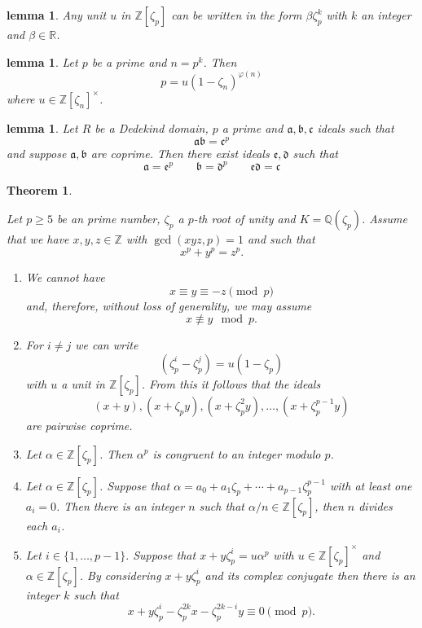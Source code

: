 \documentclass[11pt,a4paper]{amsart}
\theoremstyle{plain}
\newtheorem{theorem}[subsection]{Theorem}
\newtheorem{lemma}[subsection]{lemma}
\theoremstyle{definition}
\theoremstyle{definition}
\newcommand{\ZZ}{\mathbb{Z}}
\newcommand{\RR}{\mathbb{R}}
\def\QQ{\mathbb{Q}}
\def\gothb{\mathfrak{b}}
\def\gothc{\mathfrak{c}}
\def \a{\alpha}
\def\gotha{\mathfrak{a}}
\begin{document}
	
	\begin{lemma}\label{lemma: unit lemma}
		Any unit $u$ in $\ZZ[\zeta_p]$ can be written in the form $\beta \zeta_p^k  $ with $k$ an integer and $\beta \in \RR$.
	\end{lemma}	
	
	\begin{lemma}\label{lemma: fac of p in p_th root}
		Let $p$ be a prime and $n=p^k$. Then \[p=u(1-\zeta_n)^{\varphi(n)}\] where $u \in \ZZ[\zeta_n]^{\times}$.
	\end{lemma}
	
	\begin{lemma}\label{lemma: ideals mult to power}
		Let $R$ be a Dedekind domain, $p$ a prime and $\gotha,\gothb,\gothc$ ideals such that \[\gotha\gothb=\gothc^p\] and suppose $\gotha,\gothb$ are coprime. Then there exist ideals $\mathfrak{e},\mathfrak{d}$ such that \[\gotha=\mathfrak{e}^p \qquad \gothb=\mathfrak{d}^p \qquad \mathfrak{e}\mathfrak{d}=\gothc\] 
	\end{lemma}
	
	
	\begin{theorem}\label{theorem:FLT facts}
		
		Let $p \geq 5$ be an prime number, $\zeta_p$ a $p$-th root of unity and $K=\QQ(\zeta_p)$.  Assume that we have $x,y,z \in \ZZ$ with $\gcd(xyz,p)=1$ and such that \[x^p+y^p=z^p.\] 
		
		\begin{enumerate}
			\item We cannot have  \[x \equiv y \equiv -z \pmod p\] and, therefore, without loss of generality, we may assume \[x \not \equiv y \mod p.\]
			
			\item For $i \neq j$ we can write \[(\zeta_p^i-\zeta_p^j)=u(1-\zeta_p)\] with $u$ a unit in $\ZZ[\zeta_p]$. From this it follows that the ideals \[(x+y),(x+\zeta_py),(x+\zeta_p^2y),\dots,(x+\zeta_p^{p-1}y)\] are pairwise coprime. 
			
			\item Let $\a \in \ZZ[\zeta_p]$. Then $\a^p$ is congruent to an integer modulo $p$.
			
			\item Let $\a \in \ZZ[\zeta_p]$.   Suppose that $\a=a_0+a_1\zeta_p+\cdots+a_{p-1}\zeta_p^{p-1}$ with at least one $a_i=0$. Then there is an integer $n$ such that $\a/n \in \ZZ[\zeta_p]$, then $n$ divides each $a_i$. 
			
			
			\item   Let $i \in \{1,\dots,p-1\}.$ Suppose that $x+y\zeta_p^i=u \a^p$ with $u \in \ZZ[\zeta_p]^\times$ and $\a \in \ZZ[\zeta_p]$. By considering $x+y\zeta_p^i$ and its complex conjugate then there is an integer $k$ such that \[x+y\zeta_p^i-\zeta_p^{2k}x-\zeta_p^{2k-i}y \equiv 0 \pmod p.\]
			
			
		\end{enumerate}
		
	\end{theorem}
	
\end{document}
